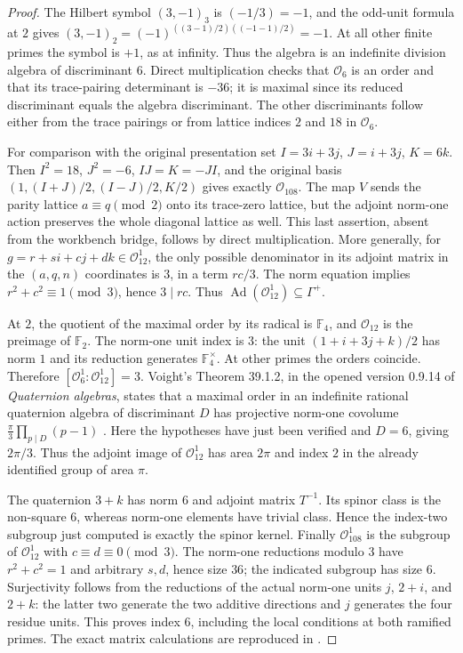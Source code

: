\begin{proof}
The Hilbert symbol $(3,-1)_3$ is $(-1/3)=-1$, and the odd-unit formula
at $2$ gives $(3,-1)_2=(-1)^{((3-1)/2)((-1-1)/2)}=-1$.
At all other finite primes the symbol is $+1$, as at infinity.
Thus the algebra is an indefinite division algebra of discriminant $6$.
Direct multiplication checks that $\mathcal O_6$ is an order and that
its trace-pairing determinant is $-36$; it is maximal since its reduced
discriminant equals the algebra discriminant. The other discriminants
follow either from the trace pairings or from lattice indices $2$ and
$18$ in $\mathcal O_6$.

For comparison with the original presentation set
$I=3i+3j$, $J=i+3j$, $K=6k$. Then $I^2=18$, $J^2=-6$, $IJ=K=-JI$,
and the original basis $(1,(I+J)/2,(I-J)/2,K/2)$ gives exactly
$\mathcal O_{108}$. The map $V$ sends the parity lattice $a\equiv q\pmod2$
onto its trace-zero lattice, but the adjoint norm-one action preserves the
whole diagonal lattice as well. This last assertion, absent from the
workbench bridge, follows by direct multiplication. More generally, for
$g=r+si+cj+dk\in\mathcal O_{12}^1$, the only possible denominator in its
adjoint matrix in the $(a,q,n)$ coordinates is $3$, in a term $rc/3$.
The norm equation implies $r^2+c^2\equiv1\pmod3$, hence $3\mid rc$.
Thus $\operatorname{Ad}(\mathcal O_{12}^1)\subseteq\Gamma^+$.

At $2$, the quotient of the maximal order by its radical is $\mathbb F_4$,
and $\mathcal O_{12}$ is the preimage of $\mathbb F_2$. The norm-one
unit index is $3$: the unit $(1+i+3j+k)/2$ has norm $1$ and its reduction
generates $\mathbb F_4^\times$. At other primes the orders coincide.
Therefore $[\mathcal O_6^1:\mathcal O_{12}^1]=3$.
Voight's Theorem 39.1.2, in the opened version 0.9.14 of
\emph{Quaternion algebras}, states that a maximal order in an indefinite
rational quaternion algebra of discriminant $D$ has projective norm-one
covolume $\frac\pi3\prod_{p\mid D}(p-1)$ \cite{Voight2018}.
Here the hypotheses have just been verified and $D=6$, giving $2\pi/3$.
Thus the adjoint image of $\mathcal O_{12}^1$ has area $2\pi$ and index
$2$ in the already identified group of area $\pi$.

The quaternion $3+k$ has norm $6$ and adjoint matrix $T^{-1}$.
Its spinor class is the non-square $6$, whereas norm-one elements have
trivial class. Hence the index-two subgroup just computed is exactly
the spinor kernel.
Finally $\mathcal O_{108}^1$ is the subgroup of $\mathcal O_{12}^1$
with $c\equiv d\equiv0\pmod3$. The norm-one reductions modulo $3$
have $r^2+c^2=1$ and arbitrary $s,d$, hence size $36$; the indicated
subgroup has size $6$. Surjectivity follows from the reductions of the
actual norm-one units $j$, $2+i$, and $2+k$: the latter two generate the
two additive directions and $j$ generates the four residue units.
This proves index $6$, including the local conditions at both ramified
primes. The exact matrix calculations are reproduced in
.
\end{proof}

